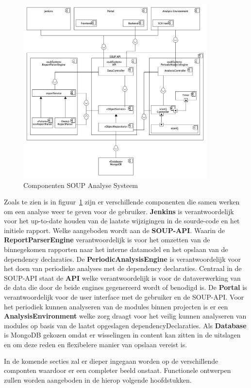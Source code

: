 \begin{figure}[bth]
    \myfloatalign
    \includegraphics[width=10cm]{gfx/umlet/exports/ApplicationComponents}
    \caption{Componenten SOUP Analyse Systeem}
    \label{fig:SOUP-Components}
\end{figure}
Zoals te zien is in figuur~\ref{fig:SOUP-Components} zijn er verschillende componenten die samen werken om een analyse weer te geven voor de gebruiker. \textbf{Jenkins} is verantwoordelijk voor het up-to-date houden van de laatste wijzigingen in de sourde-code en het initiele rapport. Welke aangeboden wordt aan de \textbf{SOUP-API}. Waarin de  \textbf{ReportParserEngine} verantwoordelijk is voor het omzetten van de binnegekomen rapporten naar het interne datamodel en het opslaan van de dependency declaraties. De \textbf{PeriodicAnalysisEngine} is verantwoordelijk voor het doen van periodieke analyses met de dependency declaraties. Centraal in de SOUP-API staat de \textbf{API} welke verantwoordelijk is voor de dataverwerking van de data die door de beide engines gegenereerd wordt of benodigd is. De \textbf{Portal} is verantwoordelijk voor de user interface met de gebruiker en de SOUP-API. Voor het periodiek kunnen analyseren van de modules binnen projecten is er een \textbf{AnalysisEnvironment} welke zorg draagt voor het veilig kunnen analyseren van modules op basis van de laatst opgeslagen dependencyDeclaraties. Als \textbf{Database} is MongoDB gekozen omdat er wisselingen in content kan zitten in de uitslagen en om deze reden en flexibelere manier van opslaan vereist is.

In de komende secties zal er dieper ingegaan worden op de verschillende componten waardoor er een completer beeld onstaat. Functionele ontwerpen zullen worden aangeboden in de hierop volgende hoofdstukken.

